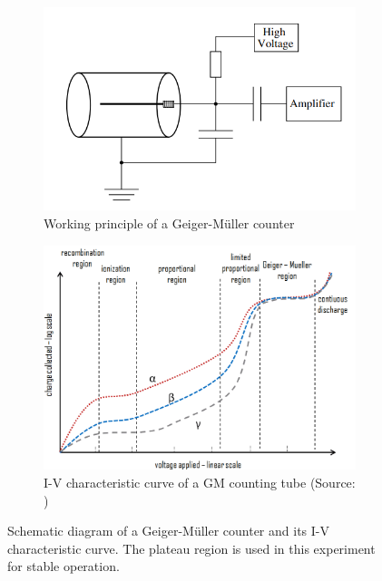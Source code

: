 \documentclass[12pt,a4paper]{article}
\begin{document}
\begin{figure}[H]
  \centering
  \begin{subfigure}{0.49\textwidth}
    \centering
    \includegraphics[width=1.0\textwidth]{Pictures/GM_Schematic.png}
    \caption{Working principle of a Geiger-Müller counter}
    \label{fig:GM_schematic}  
  \end{subfigure}
  \begin{subfigure}{0.49\textwidth}
    \centering
    \includegraphics[width=1.0\textwidth]{Pictures/GM_IV.png}
    \caption{I-V characteristic curve of a GM counting tube (Source: \cite{GM})}
    \label{fig:GM_IV}
  \end{subfigure}
  \caption{Schematic diagram of a Geiger-Müller counter and its I-V characteristic curve. The plateau region is used in this experiment for stable operation.}
\end{figure}
\end{document}
